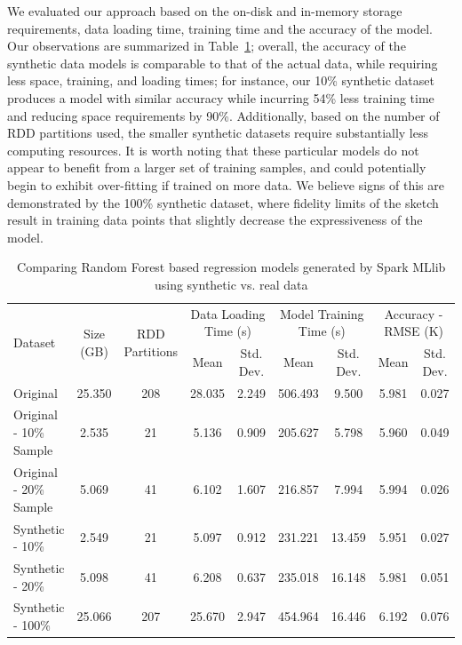 \documentclass[9pt,journal,compsoc]{IEEEtran}
\begin{document}
We evaluated our approach based on the on-disk and in-memory storage requirements, data loading time, training time and the accuracy of the model.
Our observations are summarized in Table~\ref{tab:spark-rf}; overall, the accuracy of the synthetic data models is comparable to that of the actual data, while requiring less space, training, and loading times;
for instance, our 10\% synthetic dataset produces a model with similar accuracy while incurring 54\% less training time and reducing space requirements by 90\%. Additionally, based on the number of RDD partitions used, the smaller synthetic datasets require substantially less computing resources.  It is worth noting that these particular models do not appear to benefit from a larger set of training samples, and could potentially begin to exhibit over-fitting if trained on more data.
We believe signs of this are demonstrated by the 100\% synthetic dataset, where fidelity limits of the sketch result in training data points that slightly decrease the expressiveness of the model. \vspace{-1em}
%
\begin{table}[ht!]
    \renewcommand{\arraystretch}{1.2}
    \caption{Comparing Random Forest based regression models generated by Spark MLlib using synthetic vs. real data \vspace{-1em}}
    \label{tab:spark-rf}
    \begin{center}
        \begin{tabularx}{\textwidth}{|X|c|c|c|c|c|c|c|c|}
            \hline
            \multirow{2}{*}{Dataset} & \multirow{2}{*}{Size (GB)} & \multirow{2}{*}{RDD Partitions} & \multicolumn{2}{c|}{\cellcolor[gray]{0.7}Data Loading Time (s)} &\multicolumn{2}{c|}{\cellcolor[gray]{0.7}Model Training Time (s)} & \multicolumn{2}{c|}{\cellcolor[gray]{0.7}Accuracy - RMSE (K)}\\
            \cline{4-9}
             & & & \cellcolor[gray]{0.9}Mean & \cellcolor[gray]{0.9}Std. Dev.  &  \cellcolor[gray]{0.9}Mean & \cellcolor[gray]{0.9}Std. Dev. &  \cellcolor[gray]{0.9}Mean & \cellcolor[gray]{0.9}Std. Dev. \\
            \hline
            Original & 25.350 & 208 & 28.035 & 2.249 & 506.493 & 9.500 & 5.981 & 0.027 \\
            \hline
            Original - 10\% Sample & 2.535 & 21 & 5.136 & 0.909 & 205.627 & 5.798 & 5.960  & 0.049 \\
            \hline
            Original - 20\% Sample & 5.069 & 41 & 6.102 & 1.607 & 216.857 & 7.994 & 5.994 & 0.026 \\
            \hline
            Synthetic - 10\% & 2.549 & 21 & 5.097 & 0.912 & 231.221 & 13.459 & 5.951 & 0.027 \\
            \hline
            Synthetic - 20\% & 5.098 & 41 & 6.208 & 0.637 & 235.018 & 16.148 & 5.981 & 0.051 \\
            \hline
            Synthetic - 100\% & 25.066 & 207 & 25.670 & 2.947 & 454.964 & 16.446 & 6.192 & 0.076 \\
            \hline
        \end{tabularx}
    \end{center}
    \vspace{-1em}
\end{table}
%
%
\end{document}
